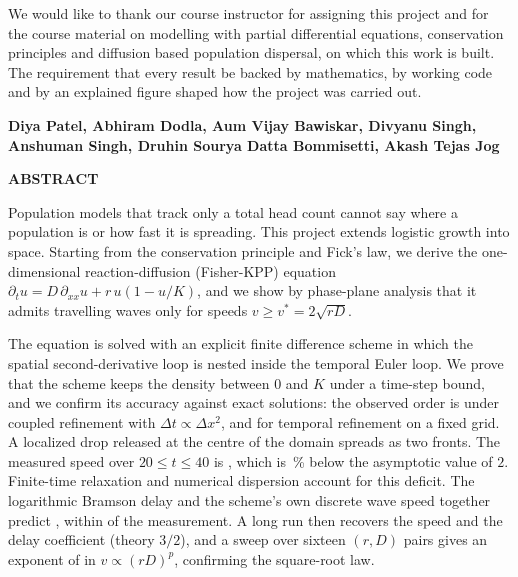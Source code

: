 \documentclass[11pt,a4paper]{article}
\begin{document}
We would like to thank our course instructor for assigning this project and for the course
material on modelling with partial differential equations, conservation principles and
diffusion based population dispersal, on which this work is built. The requirement that every
result be backed by mathematics, by working code and by an explained figure shaped how the
project was carried out.

\vspace{0.6cm}
\textbf{Diya Patel, Abhiram Dodla, Aum Vijay Bawiskar, Divyanu Singh,}\\
\textbf{Anshuman Singh, Druhin Sourya Datta Bommisetti, Akash Tejas Jog}

\vspace{1.0cm}
\begin{center}{\Large\bfseries ABSTRACT}\end{center}
\vspace{0.4cm}

Population models that track only a total head count cannot say where a population is or how
fast it is spreading. This project extends logistic growth into space. Starting from the
conservation principle and Fick's law, we derive the one-dimensional reaction-diffusion
(Fisher-KPP) equation $\partial_t u = D\,\partial_{xx}u + r\,u(1-u/K)$, and we show by phase-plane
analysis that it admits travelling waves only for speeds $v\ge v^*=2\sqrt{rD}$.

The equation is solved with an explicit finite difference scheme in which the spatial
second-derivative loop is nested inside the temporal Euler loop. We prove that the scheme keeps
the density between $0$ and $K$ under a time-step bound, and we confirm its accuracy against
exact solutions: the observed order is \resSpaceOrder{} under coupled refinement with
$\Delta t\propto\Delta x^2$, and \resTimeOrder{} for temporal refinement on a fixed grid. A
localized drop released at the centre of the domain spreads as two fronts. The measured
speed over $20\le t\le 40$ is \resBaseSpeed{}, which is \resBasePercentLow{}\,\% below the
asymptotic value of $2$. Finite-time relaxation and numerical dispersion account for this deficit.
The logarithmic Bramson delay and the scheme's own discrete wave speed together predict \resBasePredicted{}, within
\resBaseGap{} of the measurement. A long run then recovers the speed \resLongSpeed{} and the delay
coefficient \resLongDelay{} (theory $3/2$), and a sweep over sixteen $(r,D)$ pairs gives an
exponent of \resSweepExponent{} in $v\propto(rD)^p$, confirming the square-root law.
\end{document}

